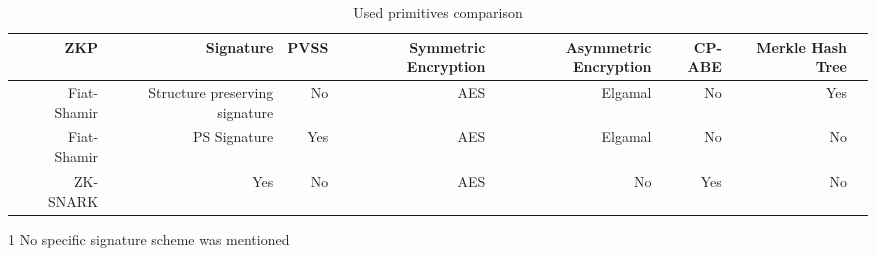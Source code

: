 \begin{table*}[h!]\centering
\caption{Used primitives comparison}\label{tab:used-primitives-comparison}
\scriptsize
\begin{threeparttable}
\begin{tabular}{lrrrrrrrr}
\toprule %
&ZKP &Signature &PVSS &Symmetric Encryption &Asymmetric Encryption &CP-ABE &Merkle Hash Tree \\\midrule
\cite{xue2023blockchain} &Fiat-Shamir &Structure preserving signature &No &AES &Elgamal &No &Yes \\
\cite{liu2022blockchain} &Fiat-Shamir &PS Signature &Yes &AES &Elgamal &No &No \\
\cite{alsharif2020blockchain} &ZK-SNARK &Yes\tnote{1} &No &AES &No &Yes &No \\
\bottomrule
\end{tabular}
\begin{tablenotes}
    \item[1] No specific signature scheme was mentioned
\end{tablenotes}
\end{threeparttable}
\end{table*}

